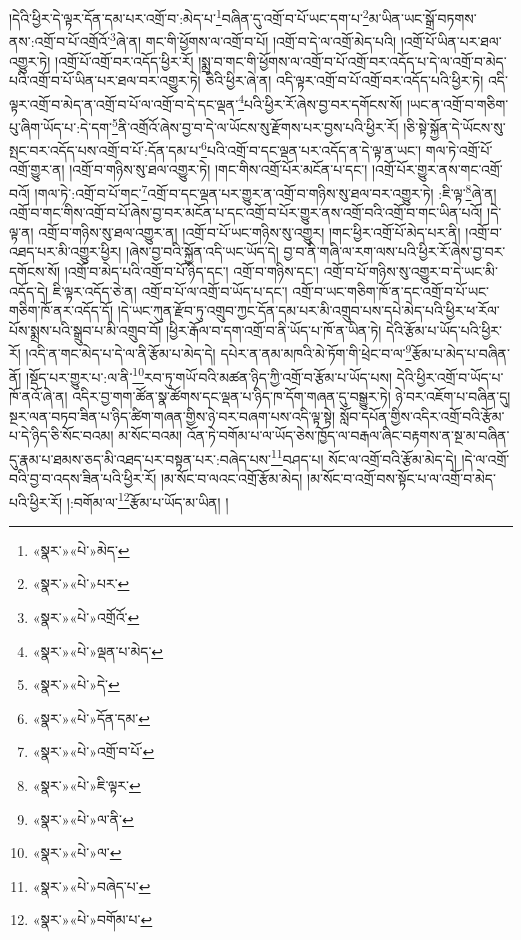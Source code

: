 །དེའི་ཕྱིར་དེ་ལྟར་དོན་དམ་པར་འགྲོ་བ་:མེད་པ་\footnote{«སྣར་»«པེ་»མེད་}བཞིན་དུ་འགྲོ་བ་པོ་ཡང་དག་པ་\footnote{«སྣར་»«པེ་»པར་}མ་ཡིན་ཡང་སྒྲོ་བཏགས་ནས་:འགྲོ་བ་པོ་འགྲོའོ་\footnote{«སྣར་»«པེ་»འགྲོའོ་}ཞེ་ན། གང་གི་ཕྱོགས་ལ་འགྲོ་བ་པོ། །འགྲོ་བ་དེ་ལ་འགྲོ་མེད་པའི། །འགྲོ་པོ་ཡིན་པར་ཐལ་འགྱུར་ཏེ། །འགྲོ་པོ་འགྲོ་བར་འདོད་ཕྱིར་རོ། །སྨྲ་བ་གང་གི་ཕྱོགས་ལ་འགྲོ་བ་པོ་འགྲོ་བར་འདོད་པ་དེ་ལ་འགྲོ་བ་མེད་པའི་འགྲོ་བ་པོ་ཡིན་པར་ཐལ་བར་འགྱུར་ཏེ། ཅིའི་ཕྱིར་ཞེ་ན། འདི་ལྟར་འགྲོ་བ་པོ་འགྲོ་བར་འདོད་པའི་ཕྱིར་ཏེ། འདི་ལྟར་འགྲོ་བ་མེད་ན་འགྲོ་བ་པོ་ལ་འགྲོ་བ་དེ་དང་ལྡན་\footnote{«སྣར་»«པེ་»ལྡན་པ་མེད་}པའི་ཕྱིར་རོ་ཞེས་བྱ་བར་དགོངས་སོ། །ཡང་ན་འགྲོ་བ་གཅིག་པུ་ཞིག་ཡོད་པ་:དེ་དག་\footnote{«སྣར་»«པེ་»དེ་}ནི་འགྲོའོ་ཞེས་བྱ་བ་དེ་ལ་ཡོངས་སུ་རྫོགས་པར་བྱས་པའི་ཕྱིར་རོ། །ཅི་སྟེ་སྐྱོན་དེ་ཡོངས་སུ་སྤང་བར་འདོད་པས་འགྲོ་བ་པོ་:དོན་དམ་པ་\footnote{«སྣར་»«པེ་»དོན་དམ་}པའི་འགྲོ་བ་དང་ལྡན་པར་འདོད་ན་དེ་ལྟ་ན་ཡང་། གལ་ཏེ་འགྲོ་པོ་འགྲོ་གྱུར་ན། །འགྲོ་བ་གཉིས་སུ་ཐལ་འགྱུར་ཏེ། །གང་གིས་འགྲོ་པོར་མངོན་པ་དང་། །འགྲོ་པོར་གྱུར་ནས་གང་འགྲོ་བའོ། །གལ་ཏེ་:འགྲོ་བ་པོ་གང་\footnote{«སྣར་»«པེ་»འགྲོ་བ་པོ་}འགྲོ་བ་དང་ལྡན་པར་གྱུར་ན་འགྲོ་བ་གཉིས་སུ་ཐལ་བར་འགྱུར་ཏེ། :ཇི་ལྟ་\footnote{«སྣར་»«པེ་»ཇི་ལྟར་}ཞེ་ན། འགྲོ་བ་གང་གིས་འགྲོ་བ་པོ་ཞེས་བྱ་བར་མངོན་པ་དང་འགྲོ་བ་པོར་གྱུར་ནས་འགྲོ་བའི་འགྲོ་བ་གང་ཡིན་པའོ། །དེ་ལྟ་ན། འགྲོ་བ་གཉིས་སུ་ཐལ་འགྱུར་ན། །འགྲོ་བ་པོ་ཡང་གཉིས་སུ་འགྱུར། །གང་ཕྱིར་འགྲོ་པོ་མེད་པར་ནི། །འགྲོ་བ་འཐད་པར་མི་འགྱུར་ཕྱིར། །ཞེས་བྱ་བའི་སྐྱོན་འདི་ཡང་ཡོད་དེ། བྱ་བ་ནི་གཞི་ལ་རག་ལས་པའི་ཕྱིར་རོ་ཞེས་བྱ་བར་དགོངས་སོ། །འགྲོ་བ་མེད་པའི་འགྲོ་བ་པོ་ཉིད་དང་། འགྲོ་བ་གཉིས་དང་། འགྲོ་བ་པོ་གཉིས་སུ་འགྱུར་བ་དེ་ཡང་མི་འདོད་དེ། ཇི་ལྟར་འདོད་ཅེ་ན། འགྲོ་བ་པོ་ལ་འགྲོ་བ་ཡོད་པ་དང་། འགྲོ་བ་ཡང་གཅིག་ཁོ་ན་དང་འགྲོ་བ་པོ་ཡང་གཅིག་ཁོ་ནར་འདོད་དོ། །དེ་ཡང་ཀུན་རྫོབ་ཏུ་འགྲུབ་ཀྱང་དོན་དམ་པར་མི་འགྲུབ་པས་དཔེ་མེད་པའི་ཕྱིར་ཕ་རོལ་པོས་སྨྲས་པའི་སྒྲུབ་པ་མི་འགྲུབ་བོ། །ཕྱིར་རྒོལ་བ་དག་འགྲོ་བ་ནི་ཡོད་པ་ཁོ་ན་ཡིན་ཏེ། དེའི་རྩོམ་པ་ཡོད་པའི་ཕྱིར་རོ། །འདི་ན་གང་མེད་པ་དེ་ལ་ནི་རྩོམ་པ་མེད་དེ། དཔེར་ན་ནམ་མཁའི་མེ་ཏོག་གི་ཕྲེང་བ་ལ་\footnote{«སྣར་»«པེ་»ལ་ནི་}རྩོམ་པ་མེད་པ་བཞིན་ནོ། །སྡོད་པར་གྱུར་པ་:ལ་ནི་\footnote{«སྣར་»«པེ་»ལ་}རབ་ཏུ་གཡོ་བའི་མཚན་ཉིད་ཀྱི་འགྲོ་བ་རྩོམ་པ་ཡོད་པས། དེའི་ཕྱིར་འགྲོ་བ་ཡོད་པ་ཁོ་ནའོ་ཞེ་ན། འདིར་བྱ་གག་ཚོན་སྣ་ཚོགས་དང་ལྡན་པ་ཉིད་ཁ་དོག་གཞན་དུ་བསྒྱུར་ཏེ། ཉེ་བར་འཇོག་པ་བཞིན་དུ། སྔར་ལན་བཏབ་ཟིན་པ་ཉིད་ཚིག་གཞན་གྱིས་ཉེ་བར་བཞག་པས་འདི་ལྟ་སྟེ། སློབ་དཔོན་གྱིས་འདིར་འགྲོ་བའི་རྩོམ་པ་དེ་ཉིད་ཅི་སོང་བའམ། མ་སོང་བའམ། འོན་ཏེ་བགོམ་པ་ལ་ཡོད་ཅེས་ཁྱོད་ལ་བརྒལ་ཞིང་བརྟགས་ན་སྔ་མ་བཞིན་དུ་རྣམ་པ་ཐམས་ཅད་མི་འཐད་པར་བསྟན་པར་:བཞེད་པས་\footnote{«སྣར་»«པེ་»བཞེད་པ་}བཤད་པ། སོང་ལ་འགྲོ་བའི་རྩོམ་མེད་དེ། །དེ་ལ་འགྲོ་བའི་བྱ་བ་འདས་ཟིན་པའི་ཕྱིར་རོ། །མ་སོང་བ་ལའང་འགྲོ་རྩོམ་མེད། །མ་སོང་བ་འགྲོ་བས་སྟོང་པ་ལ་འགྲོ་བ་མེད་པའི་ཕྱིར་རོ། །:བགོམ་ལ་\footnote{«སྣར་»«པེ་»བགོམ་པ་}རྩོམ་པ་ཡོད་མ་ཡིན། །
